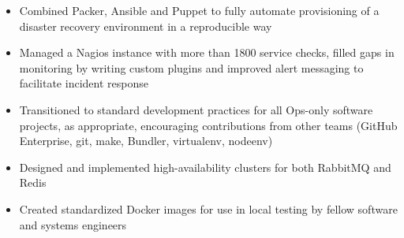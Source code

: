 \documentclass[10pt,letterpaper]{article}
\begin{document}
{\begin{itemize}
\item Combined Packer, Ansible and Puppet to fully automate provisioning of a
      disaster recovery environment in a reproducible way
\item Managed a Nagios instance with more than 1800 service checks, filled
      gaps in monitoring by writing custom plugins and improved alert
      messaging to facilitate incident response
\item Transitioned to standard development practices for all Ops-only software
      projects, as appropriate, encouraging contributions from other teams
      (GitHub Enterprise, git, make, Bundler, virtualenv, nodeenv)
\item Designed and implemented high-availability clusters for both RabbitMQ
      and Redis
\item Created standardized Docker images for use in local testing by fellow
      software and systems engineers
\end{itemize}
}
\end{document}
